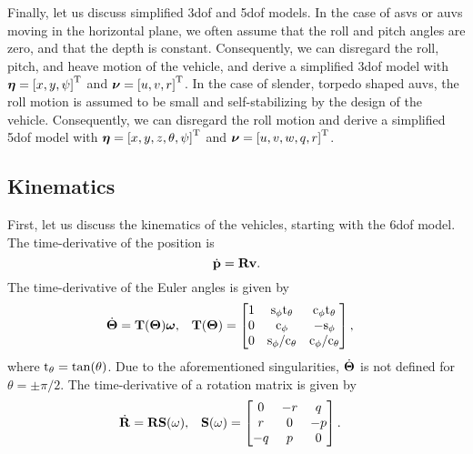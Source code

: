 Finally, let us discuss simplified 3\gls{dof} and 5\gls{dof} models.
In the case of \glspl{asv} or \glspl{auv} moving in the horizontal plane, we often assume that the roll and pitch angles are zero, and that the depth is constant.
Consequently, we can disregard the roll, pitch, and heave motion of the vehicle, and derive a simplified 3\gls{dof} model with $\bm{\eta} = \left[x, y, \psi\right]^{\mathrm{T}}$ and $\bm{\nu} = \left[u, v, r\right]^{\mathrm{T}}$.
In the case of slender, torpedo shaped \glspl{auv}, the roll motion is assumed to be small and self-stabilizing by the design of the vehicle.
Consequently, we can disregard the roll motion and derive a simplified 5\gls{dof} model with $\bm{\eta} = \left[x, y, z, \theta, \psi\right]^{\mathrm{T}}$ and $\bm{\nu} = \left[u, v, w, q, r\right]^{\mathrm{T}}$.

\subsection{Kinematics}
First, let us discuss the kinematics of the vehicles, starting with the 6\gls{dof} model.
The time-derivative of the position is
\begin{equation}
    \dot{\mathbf{p}} = \mathbf{R} \mathbf{v}.
    \label{eq:background_p_dot_6DOF}
\end{equation}
The time-derivative of the Euler angles is given by \cite{fossen_handbook_2011}
\begin{align}
    \dot{\bm{\Theta}} &= \mathbf{T}(\bm{\Theta}) \bm{\omega}, &
    \mathbf{T}(\bm{\Theta}) &= 
    \begin{bmatrix}
        1 & {\rm s}_{\phi}{\rm t}_{\theta} & {\rm c}_{\phi}{\rm t}_{\theta} \\ 0 & {\rm c}_{\phi} & -{\rm s}_{\phi} \\ 0 & {\rm s}_{\phi}/{\rm c}_{\theta} & {\rm c}_{\phi}/{\rm c}_{\theta}
    \end{bmatrix},
    \label{eq:background_theta_dot_6DOF}
\end{align}
where ${\rm t}_{\theta} = \tan(\theta)$.
Due to the aforementioned singularities, $\dot{\bm{\Theta}}$ is not defined for $\theta = \pm \pi/2$.
The time-derivative of a rotation matrix is given by
\begin{align}
    \dot{\mathbf{R}} &= \mathbf{R} \mathbf{S}(\omega), &
    \mathbf{S}(\omega) &=
    \begin{bmatrix}
        0 & -r & q\\ r & 0 & -p\\ -q & p & 0
    \end{bmatrix}.
\end{align}

